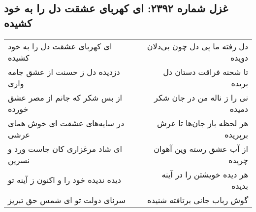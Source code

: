 \begin{center}
\section*{غزل شماره ۲۳۹۲: ای کهربای عشقت دل را به خود کشیده}
\label{sec:2392}
\begin{longtable}{l p{0.5cm} r}
ای کهربای عشقت دل را به خود کشیده
&&
دل رفته ما پی دل چون بی‌دلان دویده
\\
دزدیده دل ز حسنت از عشق جامه واری
&&
تا شحنه فراقت دستان دل بریده
\\
از بس شکر که جانم از مصر عشق خورده
&&
نی را ز ناله من در جان شکر دمیده
\\
در سایه‌های عشقت ای خوش همای عرشی
&&
هر لحظه باز جان‌ها تا عرش برپریده
\\
ای شاد مرغزاری کان جاست ورد و نسرین
&&
از آب عشق رسته وین آهوان چریده
\\
دیده ندیده خود را و اکنون ز آینه تو
&&
هر دیده خویشتن را در آینه بدیده
\\
سرنای دولت تو ای شمس حق تبریز
&&
گوش رباب جانی برتافته شنیده
\\
\end{longtable}
\end{center}
